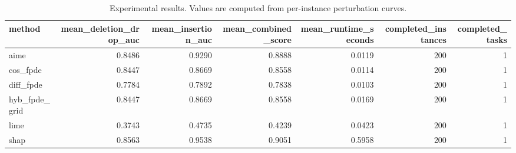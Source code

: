 \begin{table}[t]
\caption{Experimental results. Values are computed from per-instance perturbation curves.}
\label{tab:main_results_computed}
\centering
\begin{tabular}{lrrrrrr}
\toprule
method & mean\_deletion\_drop\_auc & mean\_insertion\_auc & mean\_combined\_score & mean\_runtime\_seconds & completed\_instances & completed\_tasks \\
\midrule
aime & 0.8486 & 0.9290 & 0.8888 & 0.0119 & 200 & 1 \\
cos\_fpde & 0.8447 & 0.8669 & 0.8558 & 0.0114 & 200 & 1 \\
diff\_fpde & 0.7784 & 0.7892 & 0.7838 & 0.0103 & 200 & 1 \\
hyb\_fpde\_grid & 0.8447 & 0.8669 & 0.8558 & 0.0169 & 200 & 1 \\
lime & 0.3743 & 0.4735 & 0.4239 & 0.0423 & 200 & 1 \\
shap & 0.8563 & 0.9538 & 0.9051 & 0.5958 & 200 & 1 \\
\bottomrule
\end{tabular}

\end{table}
